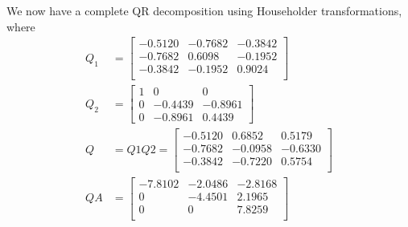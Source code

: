 We now have a complete QR decomposition using Householder transformations, where
\begin{align*}
    Q_1 &= \begin{bmatrix}
        -0.5120 & -0.7682 & -0.3842 \\
        -0.7682 & 0.6098 & -0.1952 \\
        -0.3842 & -0.1952 & 0.9024 \\
    \end{bmatrix} \\
    Q_2 &= \begin{bmatrix}
        1 & 0 & 0 \\
        0 & -0.4439 & -0.8961 \\
        0 & -0.8961 & 0.4439
    \end{bmatrix} \\
    Q &= Q1 Q2 = \begin{bmatrix}
        -0.5120 & 0.6852 & 0.5179 \\
        -0.7682 & -0.0958 & -0.6330 \\
        -0.3842 & -0.7220 & 0.5754 \\
    \end{bmatrix} \\
    QA &= \begin{bmatrix}
        -7.8102 & -2.0486 & -2.8168 \\
        0 &  -4.4501 & 2.1965 \\
        0 & 0 & 7.8259 \\
    \end{bmatrix}
\end{align*}